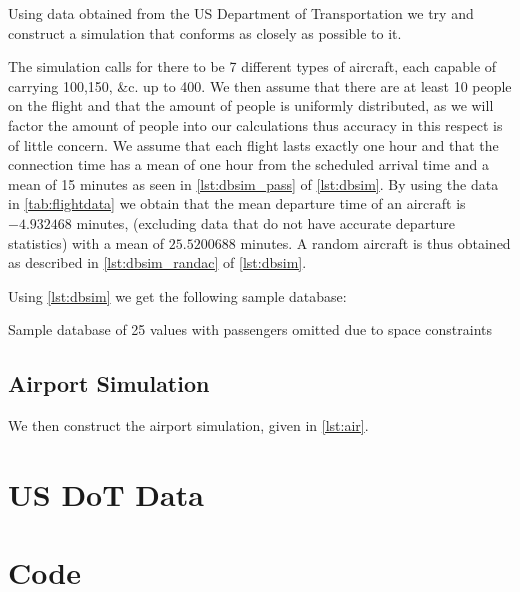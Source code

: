 \documentclass[titlepage]{article}
\numberwithin{equation}{section}
\begin{document}
Using data obtained from the US Department of Transportation \cite{USDoTData} we try and construct a simulation that conforms as closely as possible to it. 

The simulation calls for there to be 7 different types of aircraft, each capable of carrying 100,150, \&c. up to 400. We then assume that there are  at least 10 people on the flight and that the amount of people is uniformly distributed, as we will factor the amount of people into our calculations thus accuracy in this respect is of little concern.
We assume that each flight lasts exactly one hour and that the connection time has a mean of one hour from the scheduled arrival time and a mean of 15 minutes as seen in \autoref{lst:dbsim_pass} of \autoref{lst:dbsim}. By using the data in \autoref{tab:flightdata} we obtain that the mean departure time of an aircraft is $-4.932468$ minutes, (excluding data that do not have accurate departure statistics) with a mean of $25.5200688$ minutes. A random aircraft is thus obtained as described in \autoref{lst:dbsim_randac} of \autoref{lst:dbsim}.

Using \autoref{lst:dbsim} we get the following sample database:

\begin{table}[h!]
\caption{Sample database of 25 values with passengers omitted due to space constraints}
\label{tab:sampledata}
\centering
{}
\end{table}

\subsection{Airport Simulation}
We then construct the airport simulation, given in \autoref{lst:air}.

\newpage
\begin{appendices}
\section{US DoT Data}

\DTLsetseparator{,}


\newpage
\section{Code}

\newpage


\end{appendices}

\newpage
{}


\end{document}
